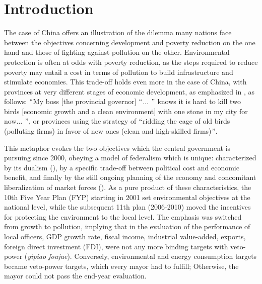 \documentclass[12pt]{article}
\begin{document}
\pagebreak \newpage

\doublespacing

\section{Introduction }

The case of China offers an illustration of the dilemma many nations face between the objectives concerning development and poverty reduction on the one hand and those of fighting against pollution on the other. Environmental protection is often at odds with poverty reduction, as the steps required to reduce poverty may entail a cost in terms of pollution to build infrastructure and stimulate economies. This trade-off holds even more in the case of China, with provinces at very different stages of economic development, as emphasized in \citet[p.196 and p.198]{Kahn2016-fi}, as follows: $``$My boss [the provincial governor] $``$$ \ldots $ $"$  knows it is hard to kill two birds [economic growth and a clean environment] with one stone in my city for now$ \ldots $ $"$, or provinces using the strategy of $``$ridding the cage of old birds (polluting firms) in favor of new ones (clean and high-skilled firms)$"$.



This metaphor evokes the two objectives which the central government is pursuing since 2000, obeying a model of federalism which is unique: characterized by its dualism  (\citealt{Vahabi1995-fm}), by a specific trade-off between political cost and economic benefit, and finally by the still ongoing planning of the economy and concomitant liberalization of market forces (\citealt{Berglof1998-oc, Qian1998-yf}). As a pure product of these characteristics, the 10th Five Year Plan (FYP) starting in 2001 set environmental objectives at the national level, while the subsequent 11th plan (2006-2010) moved the incentives for protecting the environment to the local level. The emphasis was switched from growth to pollution, implying that in the evaluation of the performance of local officers, GDP growth rate, fiscal income, industrial value-added, exports, foreign direct investment (FDI), were not any more binding targets with veto-power (\textit{yipiao foujue}). Conversely, environmental and energy consumption targets became veto-power targets, which every mayor had to fulfill; Otherwise, the mayor could not pass the end-year evaluation.
\end{document}

